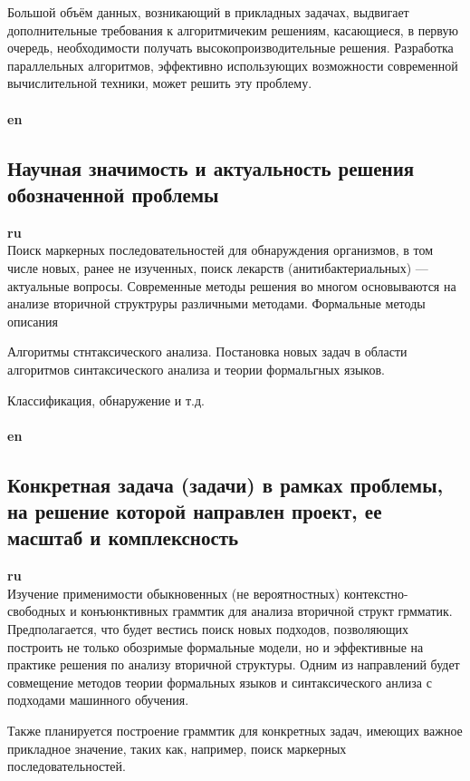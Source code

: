 \documentclass[12pt]{article}  %
\theoremstyle{remark}
\begin{document}
Большой объём данных, возникающий в прикладных задачах, выдвигает дополнительные требования к алгоритмичеким решениям, касающиеся, в первую очередь, необходимости получать высокопроизводительные решения.
Разработка параллельных алгоритмов, эффективно использующих возможности современной вычислительной техники, может решить эту проблему.
\\
\\
\textbf{en}\\



\subsection{Научная значимость и актуальность решения обозначенной проблемы}

\textbf{ru}\\
Поиск маркерных последовательностей для обнаруждения организмов, в том числе новых, ранее не изученных, поиск лекарств (анитибактериальных) --- актуальные вопросы.
Современные методы решения во многом основываются на анализе вторичной структруры различными методами.
Формальные методы описания

Алгоритмы стнтаксического анализа.
Постановка новых задач в области алгоритмов синтаксического анализа и теории формальгных языков.

Классификация, обнаружение и т.д.
\\
\\
\textbf{en}\\



\subsection{Конкретная задача (задачи) в рамках проблемы, на решение которой направлен проект, ее масштаб и комплексность}

\textbf{ru}\\
Изучение применимости обыкновенных (не вероятностных) контекстно-свободных и конъюнктивных граммтик для анализа вторичной структ грмматик.
Предполагается, что будет вестись поиск новых подходов, позволяющих построить не только обозримые формальные модели, но и эффективные на практике решения по анализу вторичной структуры.
Одним из направлений будет совмещение методов теории формальных языков и синтаксического анлиза с подходами машинного обучения.

Также планируется построение граммтик для конкретных задач, имеющих важное прикладное значение, таких как, например, поиск маркерных последовательностей.
\end{document}
